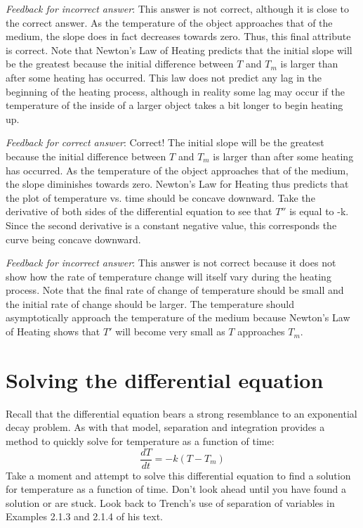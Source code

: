 \documentclass{ximera}
\begin{document}
\emph{Feedback for incorrect answer}: This answer is not correct, although it is close to the correct answer.  As the temperature of the object approaches that of the medium, the slope does in fact decreases towards zero.  Thus, this final attribute is correct.  Note that Newton's Law of Heating predicts that the initial slope will be the greatest because the initial difference between $T$ and $T_m$ is larger than after some heating has occurred.  This law does not predict any lag in the beginning of the heating process, although in reality some lag may occur if the temperature of the inside of a larger object takes a bit longer to begin heating up.  
 
\emph{Feedback for correct answer}: Correct!  The initial slope will be the greatest because the initial difference between $T$ and $T_m$ is larger than after some heating has occurred.  As the temperature of the object approaches that of the medium, the slope diminishes towards zero.  Newton's Law for Heating thus predicts that the plot of temperature vs. time should be concave downward.  Take the derivative of both sides of the differential equation to see that $T''$ is equal to -k.  Since the second derivative is a constant negative value, this corresponds the curve being concave downward.

 
\emph{Feedback for incorrect answer}: This answer is not correct because it does not show how the rate of temperature change will itself vary during the heating process.  Note that the final rate of change of temperature should be small and the initial rate of change should be larger.  The temperature should asymptotically approach the temperature of the medium because Newton's Law of Heating shows that $T'$ will become very small as $T$ approaches $T_m$.

\section*{Solving the differential equation}

Recall that the differential equation bears a strong resemblance to an exponential decay problem.  As with that model, separation and integration provides a method to quickly solve for temperature as a function of time:
\[
\frac{dT}{dt}=-k(T-T_m)
\]
Take a moment and attempt to solve this differential equation to find a solution for temperature as a function of time.  Don't look ahead until you have found a solution or are stuck.  Look back to Trench's use of separation of variables in Examples 2.1.3 and 2.1.4 of his text.
   
\end{document}

